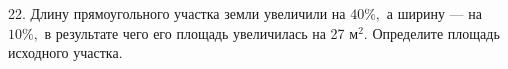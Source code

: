 22. Длину прямоугольного участка земли увеличили на $40\%,$ а ширину --- на $10\%,$ в результате чего его площадь увеличилась на 27 $\text{м}^2.$ Определите площадь исходного участка.\\
